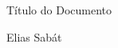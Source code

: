 \documentclass[a4paper, 12pt]{article}
\begin{document}
\begin{center}
\huge{Título do Documento}
\end{center}
\begin{center}
Elias Sabát
\end{center}
\end{document}
